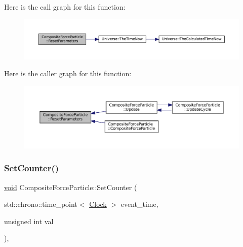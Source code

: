 Here is the call graph for this function\+:\nopagebreak
\begin{figure}[H]
\begin{center}
\leavevmode
\includegraphics[width=350pt]{class_composite_force_particle_ab4767179e32f6d2b4b31941dd3c48b10_cgraph}
\end{center}
\end{figure}
Here is the caller graph for this function\+:\nopagebreak
\begin{figure}[H]
\begin{center}
\leavevmode
\includegraphics[width=350pt]{class_composite_force_particle_ab4767179e32f6d2b4b31941dd3c48b10_icgraph}
\end{center}
\end{figure}
\mbox{\label{class_composite_force_particle_a41cee6bd5a75fbf67fa6e76a9e7d7605}} 
\subsubsection{\texorpdfstring{Set\+Counter()}{SetCounter()}}
{\footnotesize\ttfamily \mbox{\hyperlink{glad_8h_a950fc91edb4504f62f1c577bf4727c29}{void}} Composite\+Force\+Particle\+::\+Set\+Counter (\begin{DoxyParamCaption}\item[{std\+::chrono\+::time\+\_\+point$<$ \mbox{\hyperlink{universe_8h_a0ef8d951d1ca5ab3cfaf7ab4c7a6fd80}{Clock}} $>$}]{event\+\_\+time,  }\item[{unsigned int}]{val }\end{DoxyParamCaption})\hspace{0.3cm}{\ttfamily [inline]}, {\ttfamily [virtual]}}




